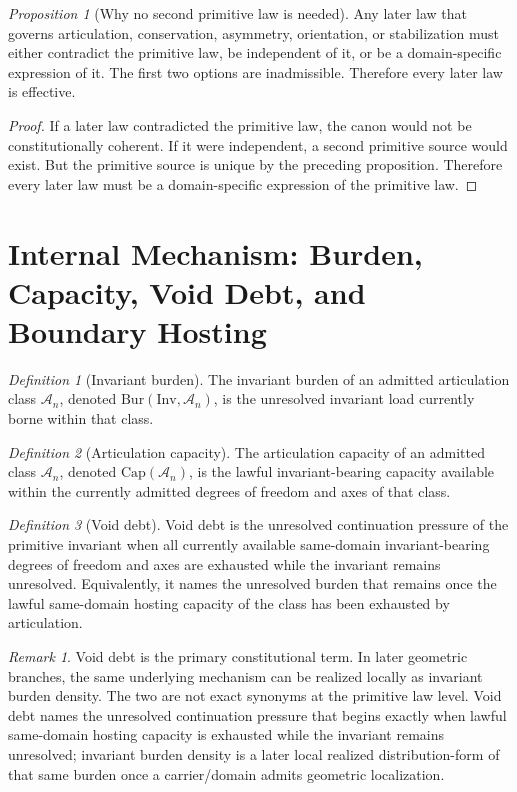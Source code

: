 \documentclass[11pt]{article}
\theoremstyle{definition}
\theoremstyle{plain}
\theoremstyle{remark}
\newtheorem{proposition}{Proposition}
\newtheorem{definition}{Definition}
\newtheorem{remark}{Remark}
\newcommand{\Inv}{\mathrm{Inv}}
\newcommand{\Bur}{\mathrm{Bur}}
\newcommand{\ArtCap}{\mathrm{Cap}}
\newcommand{\Aclass}{\mathcal{A}}
\begin{document}
\begin{proposition}[Why no second primitive law is needed]
Any later law that governs articulation, conservation, asymmetry, orientation, or stabilization must either contradict the primitive law, be independent of it, or be a domain-specific expression of it. The first two options are inadmissible. Therefore every later law is effective.
\end{proposition}

\begin{proof}
If a later law contradicted the primitive law, the canon would not be constitutionally coherent. If it were independent, a second primitive source would exist. But the primitive source is unique by the preceding proposition. Therefore every later law must be a domain-specific expression of the primitive law. 
\end{proof}

\section{Internal Mechanism: Burden, Capacity, Void Debt, and Boundary Hosting}

\begin{definition}[Invariant burden]
The invariant burden of an admitted articulation class $\Aclass_n$, denoted $\Bur(\Inv,\Aclass_n)$, is the unresolved invariant load currently borne within that class.
\end{definition}

\begin{definition}[Articulation capacity]
The articulation capacity of an admitted class $\Aclass_n$, denoted $\ArtCap(\Aclass_n)$, is the lawful invariant-bearing capacity available within the currently admitted degrees of freedom and axes of that class.
\end{definition}

\begin{definition}[Void debt]
Void debt is the unresolved continuation pressure of the primitive invariant when all currently available same-domain invariant-bearing degrees of freedom and axes are exhausted while the invariant remains unresolved. Equivalently, it names the unresolved burden that remains once the lawful same-domain hosting capacity of the class has been exhausted by articulation.
\end{definition}

\begin{remark}
Void debt is the primary constitutional term. In later geometric branches, the same underlying mechanism can be realized locally as invariant burden density. The two are not exact synonyms at the primitive law level. Void debt names the unresolved continuation pressure that begins exactly when lawful same-domain hosting capacity is exhausted while the invariant remains unresolved; invariant burden density is a later local realized distribution-form of that same burden once a carrier/domain admits geometric localization.
\end{remark}
\end{document}
